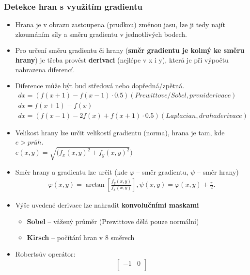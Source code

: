 \subsubsection{Detekce hran s využitím gradientu}
\begin{itemize}
 	\item Hrana je v obrazu zastoupena (prudkou) změnou jasu, lze ji tedy najít zkoumáním síly a směru gradientu v jednotlivých bodech.
 	\item Pro určení směru gradientu či hrany (​\textbf{směr gradientu je kolmý ke směru hrany​}) je třeba provést ​ \textbf{derivaci​} (nejlépe v x i y), která je při výpočtu nahrazena diferencí.
 	\item Diference může být buď středová nebo dopředná/zpětná.
 	\begin{equation*}
 		\begin{array}{c}
 		dx = (f(x+1) - f(x - 1) \cdot 0.5) (Prewittove / Sobel, prvni derivace) \\
 		dx = f(x+1) - f(x) \\
 		dx = (f(x-1) - 2f(x) + f(x+1) \cdot 0.5) (Laplacian, druha derivace)
 		\end{array}
 	\end{equation*}
 	 \item Velikost hrany lze určit velikostí gradientu (norma), hrana je tam, kde $e > práh$. \\
 	 $ e(x, y) = \sqrt{(f_x(x,y)^2+ f_y(x,y)^2})$
 	 \item Směr hrany a gradientu lze určit (kde $\varphi$ -- směr gradientu, $\psi$ -- směr hrany) 
 	  	\begin{equation*}
 		\begin{array}{c}
 		\varphi(x, y) = \arctan{[\frac{f_y(x,y)}{f_x(x,y)}]}, \psi(x,y) = \varphi(x,y) + \frac{\pi}{2}.
 		\end{array}
 	\end{equation*}
 	\item Výše uvedené derivace lze nahradit \textbf{konvolučními maskami}
 	\begin{itemize}
 		\item \textbf{Sobel} -- vážený průměr (Prewittove dělá pouze normální)
 		\item \textbf{Kirsch} -- počítání hran v 8 směrech
 	\end{itemize}
	\item Robertsův operátor:
	\begin{equation*}
 		\begin{bmatrix}
     -1 & 0      \\[0.3em]

\end{bmatrix}
\end{equation*}
\end{itemize}

